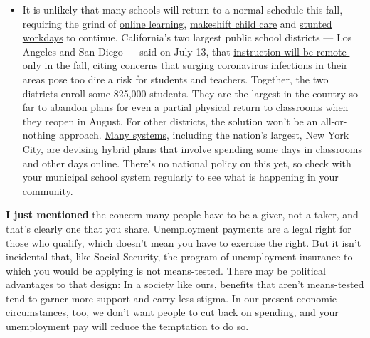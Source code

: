 \begin{itemize}
  \begin{itemize}
  \tightlist
  \item
    It is unlikely that many schools will return to a normal schedule
    this fall, requiring the grind of
    \href{https://www.nytimes3xbfgragh.onion/2020/06/05/us/coronavirus-education-lost-learning.html?action=click\&pgtype=Article\&state=default\&region=MAIN_CONTENT_3\&context=storylines_faq}{online
    learning},
    \href{https://www.nytimes3xbfgragh.onion/2020/05/29/us/coronavirus-child-care-centers.html?action=click\&pgtype=Article\&state=default\&region=MAIN_CONTENT_3\&context=storylines_faq}{makeshift
    child care} and
    \href{https://www.nytimes3xbfgragh.onion/2020/06/03/business/economy/coronavirus-working-women.html?action=click\&pgtype=Article\&state=default\&region=MAIN_CONTENT_3\&context=storylines_faq}{stunted
    workdays} to continue. California's two largest public school
    districts --- Los Angeles and San Diego --- said on July 13, that
    \href{https://www.nytimes3xbfgragh.onion/2020/07/13/us/lausd-san-diego-school-reopening.html?action=click\&pgtype=Article\&state=default\&region=MAIN_CONTENT_3\&context=storylines_faq}{instruction
    will be remote-only in the fall}, citing concerns that surging
    coronavirus infections in their areas pose too dire a risk for
    students and teachers. Together, the two districts enroll some
    825,000 students. They are the largest in the country so far to
    abandon plans for even a partial physical return to classrooms when
    they reopen in August. For other districts, the solution won't be an
    all-or-nothing approach.
    \href{https://bioethics.jhu.edu/research-and-outreach/projects/eschool-initiative/school-policy-tracker/}{Many
    systems}, including the nation's largest, New York City, are
    devising
    \href{https://www.nytimes3xbfgragh.onion/2020/06/26/us/coronavirus-schools-reopen-fall.html?action=click\&pgtype=Article\&state=default\&region=MAIN_CONTENT_3\&context=storylines_faq}{hybrid
    plans} that involve spending some days in classrooms and other days
    online. There's no national policy on this yet, so check with your
    municipal school system regularly to see what is happening in your
    community.
  \end{itemize}
\end{itemize}

\textbf{I just mentioned} the concern many people have to be a giver,
not a taker, and that's clearly one that you share. Unemployment
payments are a legal right for those who qualify, which doesn't mean you
have to exercise the right. But it isn't incidental that, like Social
Security, the program of unemployment insurance to which you would be
applying is not means-tested. There may be political advantages to that
design: In a society like ours, benefits that aren't means-tested tend
to garner more support and carry less stigma. In our present economic
circumstances, too, we don't want people to cut back on spending, and
your unemployment pay will reduce the temptation to do so.

